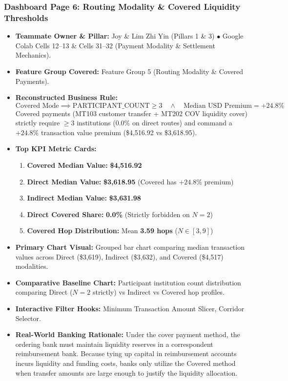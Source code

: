 \documentclass[11pt,a4paper]{article}
\begin{document}
\subsubsection{Dashboard Page 6: Routing Modality \& Covered Liquidity Thresholds}
\begin{itemize}
    \item \textbf{Teammate Owner \& Pillar:} Joy \& Lim Zhi Yin (Pillars 1 \& 3) $\bullet$ Google Colab Cells 12--13 \& Cells 31--32 (Payment Modality \& Settlement Mechanics).
    \item \textbf{Feature Group Covered:} Feature Group 5 (Routing Modality \& Covered Payments).
    \item \textbf{Reconstructed Business Rule:}
    \begin{equation}
    \text{Covered Mode} \implies \text{PARTICIPANT\_COUNT} \ge 3 \quad \land \quad \text{Median USD Premium} = +24.8\%
    \end{equation}
    Covered payments (MT103 customer transfer + MT202 COV liquidity cover) strictly require $\ge 3$ institutions (0.0\% on direct routes) and command a $+24.8\%$ transaction value premium (\$4,516.92 vs \$3,618.95).
    \item \textbf{Top KPI Metric Cards:}
    \begin{enumerate}
        \item \textbf{Covered Median Value:} \textbf{\$4,516.92}
        \item \textbf{Direct Median Value:} \textbf{\$3,618.95} (Covered has $+24.8\%$ premium)
        \item \textbf{Indirect Median Value:} \textbf{\$3,631.98}
        \item \textbf{Direct Covered Share:} \textbf{0.0\%} (Strictly forbidden on $N=2$)
        \item \textbf{Covered Hop Distribution:} Mean \textbf{3.59 hops} ($N \in [3, 9]$)
    \end{enumerate}
    \item \textbf{Primary Chart Visual:} Grouped bar chart comparing median transaction values across Direct (\$3,619), Indirect (\$3,632), and Covered (\$4,517) modalities.
    \item \textbf{Comparative Baseline Chart:} Participant institution count distribution comparing Direct ($N=2$ strictly) vs Indirect vs Covered hop profiles.
    \item \textbf{Interactive Filter Hooks:} Minimum Transaction Amount Slicer, Corridor Selector.
    \item \textbf{Real-World Banking Rationale:} Under the cover payment method, the ordering bank must maintain liquidity reserves in a correspondent reimbursement bank. Because tying up capital in reimbursement accounts incurs liquidity and funding costs, banks only utilize the Covered method when transfer amounts are large enough to justify the liquidity allocation.
\end{itemize}
\end{document}
